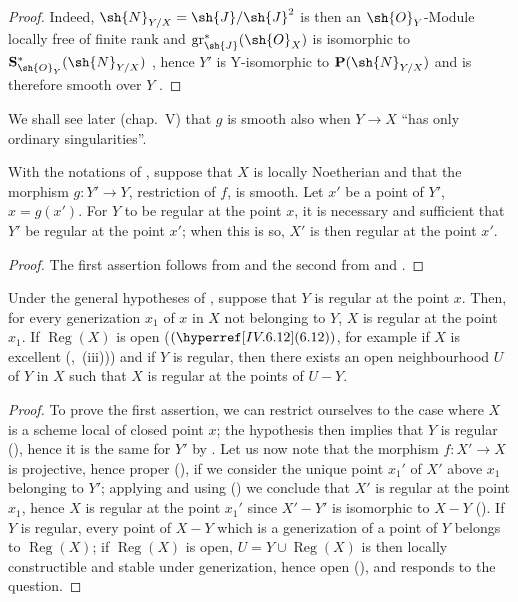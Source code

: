 \begin{proof}
Indeed, $\sh{N}_{Y/X}=\sh{J}/\sh{J}^2$ is then an $\sh{O}_Y$-Module locally free of finite rank and $\operatorname{gr}_\sh{J}^*(\sh{O}_X)$ is isomorphic to $\mathbf{S}_{\sh{O}_Y}^*(\sh{N}_{Y/X})$ , hence $Y'$ is Y-isomorphic to $\mathbf{P}(\sh{N}_{Y/X})$ and is therefore smooth over $Y$ .
\end{proof}

We shall see later (chap.~V) that $g$ is smooth also when $Y\to X$ ``has only ordinary singularities''.

\begin{proposition}[19.4.4]
\label{IV.19.4.4}
With the notations of , suppose that $X$ is locally Noetherian and that the morphism $g:Y'\to Y$, restriction of $f$, is smooth.
Let $x'$ be a point of $Y'$, $x=g(x')$.
For $Y$ to be regular at the point $x$, it is necessary and sufficient that $Y'$ be regular at the point $x'$; when this is so, $X'$ is then regular at the point $x'$.
\end{proposition}

\begin{proof}
The first assertion follows from  and the second from  and .
\end{proof}

\begin{corollary}[19.4.5]
\label{IV.19.4.5}
Under the general hypotheses of , suppose that $Y$ is regular at the point $x$.
Then, for every generization $x_1$ of $x$ in $X$ not belonging to $Y$, $X$ is regular at the point $x_1$.
If $\operatorname{Reg}(X)$ is open ($(\sref{IV.6.12})$, for example if $X$ is excellent (,~(iii)))
and if $Y$ is regular, then there exists an open neighbourhood $U$ of $Y$ in $X$ such that $X$ is regular at the points of $U-Y$.
\end{corollary}

\begin{proof}
To prove the first assertion, we can restrict ourselves to the case where $X$ is a scheme local of closed point $x$; the hypothesis then implies that $Y$ is regular (), hence it is the same for $Y'$ by .
Let us now note that the morphism $f:X'\to X$ is projective, hence proper (), if we consider the unique point $x_1'$ of $X'$ above $x_1$ belonging to $Y'$; applying  and using () we conclude that $X'$ is regular at the point $x_1$, hence $X$ is regular at the point $x_1'$ since $X'-Y'$ is isomorphic to $X-Y$ ().
If $Y$ is regular, every point of $X-Y$ which is a generization of a point of $Y$ belongs to $\operatorname{Reg}(X)$; if $\operatorname{Reg}(X)$ is open, $U=Y\cup\operatorname{Reg}(X)$ is then locally constructible and stable under generization, hence open (), and responds to the question.
\end{proof}

